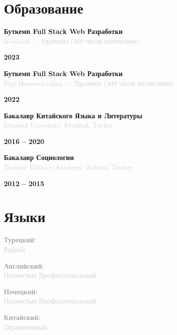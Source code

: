 \documentclass[10pt,a4paper]{article}
\newcommand{\Education}[3]{%
  \vspace{2pt}
  \noindent
  \begin{minipage}[t]{0.70\textwidth}
    {\normalsize\textbf{\color{darkgray}#1}} \\
    \textcolor{lightgray}{\small #2}
  \end{minipage}%
  \hfill
  \begin{minipage}[t]{0.28\textwidth}
    \raggedleft
    \textcolor{mediumgray}{\small\textbf{#3}}
  \end{minipage}
  \vspace{1pt}
}
\begin{document}
\section*{Образование}

\Education{Буткемп Full Stack Web Разработки}{Ironhack — Удаленно (400 часов интенсивно)}{2023}

\Education{Буткемп Full Stack Web Разработки}{Digi-Homeschooling — Удаленно (400 часов интенсивно)}{2022}

\Education{Бакалавр Китайского Языка и Литературы}{Istanbul University, Istanbul, Turkey}{2016 -- 2020}

\Education{Бакалавр Социологии}{Turkish Military Academy, Ankara, Turkey}{2012 -- 2015}

\section*{Языки}

\vspace{1pt}
\noindent
\begin{minipage}[t]{0.24\textwidth}
  \textcolor{darkgray}{\textbf{Турецкий:}} \\
  \textcolor{lightgray}{\small Родной}
\end{minipage}%
\hfill
\begin{minipage}[t]{0.24\textwidth}
  \textcolor{darkgray}{\textbf{Английский:}} \\
  \textcolor{lightgray}{\small Полностью Профессиональный}
\end{minipage}%
\hfill
\begin{minipage}[t]{0.24\textwidth}
  \textcolor{darkgray}{\textbf{Немецкий:}} \\
  \textcolor{lightgray}{\small Полностью Профессиональный}
\end{minipage}%
\hfill
\begin{minipage}[t]{0.24\textwidth}
  \textcolor{darkgray}{\textbf{Китайский:}} \\
  \textcolor{lightgray}{\small Ограниченный}
\end{minipage}
\end{document}
